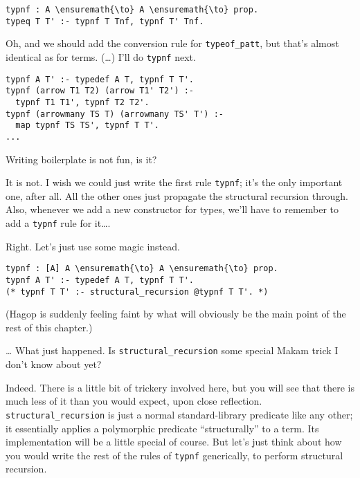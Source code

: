 \begin{verbatim}
typnf : A \ensuremath{\to} A \ensuremath{\to} prop.
typeq T T' :- typnf T Tnf, typnf T' Tnf.
\end{verbatim}

Oh, and we should add the conversion rule for \texttt{typeof\_patt}, but
that's almost identical as for terms. (\ldots{}) I'll do \texttt{typnf}
next.

\begin{verbatim}
typnf A T' :- typedef A T, typnf T T'.
typnf (arrow T1 T2) (arrow T1' T2') :-
  typnf T1 T1', typnf T2 T2'.
typnf (arrowmany TS T) (arrowmany TS' T') :-
  map typnf TS TS', typnf T T'.
...
\end{verbatim}

\heroADVISOR{} Writing boilerplate is not fun, is it?

\heroSTUDENT{} It is not. I wish we could just write the first rule
\texttt{typnf}; it's the only important one, after all. All the other
ones just propagate the structural recursion through. Also, whenever we
add a new constructor for types, we'll have to remember to add a
\texttt{typnf} rule for it\ldots{}.

\heroADVISOR{} Right. Let's just use some magic instead.

\begin{verbatim}
typnf : [A] A \ensuremath{\to} A \ensuremath{\to} prop.
typnf A T' :- typedef A T, typnf T T'.
(* typnf T T' :- structural_recursion @typnf T T'. *)
\end{verbatim}

\begin{scenecomment}
(Hagop is suddenly feeling faint by what will obviously be the main point of the rest of this chapter.)
\end{scenecomment}

\heroSTUDENT{} \ldots{} What just happened. Is \texttt{structural\_recursion}
some special Makam trick I don't know about yet?

\heroADVISOR{} Indeed. There is a little bit of trickery involved here, but
you will see that there is much less of it than you would expect, upon
close reflection. \texttt{structural\_recursion} is just a normal
standard-library predicate like any other; it essentially applies a
polymorphic predicate ``structurally'' to a term. Its implementation
will be a little special of course. But let's just think about how you
would write the rest of the rules of \texttt{typnf} generically, to
perform structural recursion.

